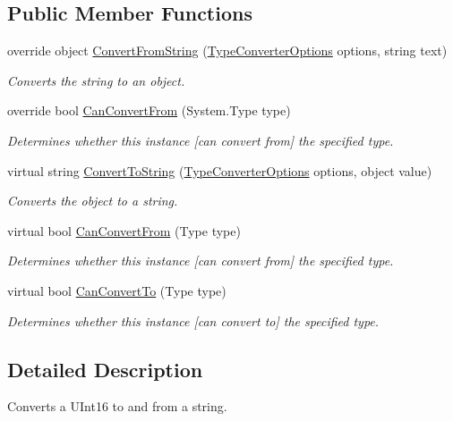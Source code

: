 \subsection*{Public Member Functions}
\begin{DoxyCompactItemize}
\item 
override object \hyperlink{a00172_a796e0b7b57d69abee122947166b45a9a}{Convert\-From\-String} (\hyperlink{a00168}{Type\-Converter\-Options} options, string text)
\begin{DoxyCompactList}\small\item\em Converts the string to an object. \end{DoxyCompactList}\item 
override bool \hyperlink{a00172_a202a9c2413a59423a51b439eab84a3bd}{Can\-Convert\-From} (System.\-Type type)
\begin{DoxyCompactList}\small\item\em Determines whether this instance \mbox{[}can convert from\mbox{]} the specified type. \end{DoxyCompactList}\item 
virtual string \hyperlink{a00078_a36cb2f9b24f15a671293f3a722324c27}{Convert\-To\-String} (\hyperlink{a00168}{Type\-Converter\-Options} options, object value)
\begin{DoxyCompactList}\small\item\em Converts the object to a string. \end{DoxyCompactList}\item 
virtual bool \hyperlink{a00078_a470d21adaa704eb281250dbd112ff91a}{Can\-Convert\-From} (Type type)
\begin{DoxyCompactList}\small\item\em Determines whether this instance \mbox{[}can convert from\mbox{]} the specified type. \end{DoxyCompactList}\item 
virtual bool \hyperlink{a00078_acb65bd8c8199d88d5b1629ae35d18514}{Can\-Convert\-To} (Type type)
\begin{DoxyCompactList}\small\item\em Determines whether this instance \mbox{[}can convert to\mbox{]} the specified type. \end{DoxyCompactList}\end{DoxyCompactItemize}


\subsection{Detailed Description}
Converts a U\-Int16 to and from a string. 



